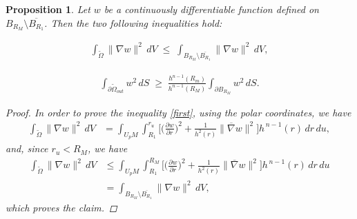 \documentclass[12pt,reqno]{amsart}
\newtheorem{proposition}{Proposition}[section]
\numberwithin{equation}{section}
\numberwithin{theorem}{section}
\numberwithin{equation}{section}
\numberwithin{theorem}{section}
\begin{document}
\begin{proposition} \label{upper bound inequality}
    Let $w$ be a continuously differentiable function defined on 
    $B_{R_M}\setminus \overline{B_{R_1}}$. Then the two following inequalities hold:
    
        \begin{align} \label{first}
        \int_{\tilde{\Omega}} \|\nabla w\|^2 \, dV 
        \;\leq\; \int_{B_{R_M}\setminus \overline{B_{R_1}}} \|\nabla w\|^2 \, dV, 
        \end{align}
        
         
       \begin{align}\label{second}
           \int_{\partial \tilde{\Omega}_{out}} w^2 \, dS
        \;\geq\; \frac{h^{n-1}(R_m)}{h^{n-1}(R_M)} 
        \int_{\partial B_{R_M}} w^2 \, dS.  \end{align}

       
    

    \begin{proof}
       In order to prove the  inequality \eqref{first}, using the 
            polar coordinates, we have
            \begin{align*}
                \int_{\tilde{\Omega}} \|\nabla w\|^2 \, dV 
                &= \int_{U_pM} \int_{R_1}^{r_u} 
                \Bigg[ \Big(\frac{\partial w}{\partial r}\Big)^2 
                + \frac{1}{h^2(r)} \|\overline{\nabla}w\|^2 \Bigg] 
                h^{\,n-1}(r)\, dr \, du,
            \end{align*}
     and, since $r_u<R_M$, we have  
            \begin{align*}
                \int_{\tilde{\Omega}} \|\nabla w\|^2 \, dV
                &\leq \int_{U_pM} \int_{R_1}^{R_M} 
                \Bigg[ \Big(\frac{\partial w}{\partial r}\Big)^2 
                + \frac{1}{h^2(r)} \|\overline{\nabla}w\|^2 \Bigg] 
                h^{\,n-1}(r)\, dr \, du \\
                &= \int_{B_{R_M}\setminus \overline{B_{R_1}}} 
                \|\nabla w\|^2 \, dV,
            \end{align*}
            which proves the claim.


\end{proof}
\end{proposition}
\end{document}
